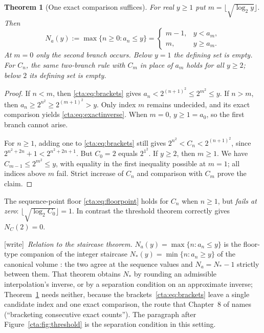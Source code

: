 \documentclass[11pt]{article}
\newtheorem{theorem}{Theorem}[section]
\theoremstyle{definition}
\theoremstyle{remark}
\newcommand{\wtag}{\textup{[write]}}
\begin{document}
\begin{theorem}[One exact comparison suffices]\label{cta:thm:threshold}
For real $y\geq1$ put $m=\lfloor\sqrt{\log_2y}\rfloor$. Then
\begin{equation}\label{cta:eq:exactinverse}
 N_a(y):=\max\{n\geq0:a_n\leq y\}
   =\begin{cases}m-1,&y<a_m,\\m,&y\geq a_m.\end{cases}
\end{equation}
At $m=0$ only the second branch occurs. Below $y=1$ the defining set is empty.
For $C_n$, the same two-branch rule with $C_m$ in place of $a_m$ holds
for all $y\geq2$; below $2$ its defining set is empty.
\end{theorem}
\begin{proof}
If $n<m$, then \eqref{cta:eq:brackets} gives
$a_n<2^{(n+1)^2}\leq2^{m^2}\leq y$. If $n>m$, then
$a_n\geq2^{n^2}\geq2^{(m+1)^2}>y$. Only index $m$ remains undecided,
and its exact comparison yields \eqref{cta:eq:exactinverse}.
When $m=0$, $y\geq1=a_0$, so the first branch cannot arise.

For $n\geq1$, adding one to \eqref{cta:eq:brackets} still gives
$2^{n^2}<C_n<2^{(n+1)^2}$, since
$2^{n^2+2n}+1<2^{n^2+2n+1}$. But $C_0=2$ equals $2^{1^2}$.
If $y\geq2$, then $m\geq1$. We have $C_{m-1}\leq2^{m^2}\leq y$,
with equality in the first inequality possible at $m=1$; all indices
above $m$ fail. Strict increase of $C_n$ and comparison with $C_m$
prove the claim.
\end{proof}

The sequence-point floor \eqref{cta:eq:floorpoint} holds for $C_n$ when
$n\geq1$, but \emph{fails at zero}:
$\lfloor\sqrt{\log_2C_0}\rfloor=1$. In contrast the threshold theorem
correctly gives $N_C(2)=0$.

\wtag\ \emph{Relation to the staircase theorem.} $N_a(y)=\max\{n:a_n\le y\}$
is the floor-type companion of the integer staircase
$N_\ast(y)=\min\{n:a_n\ge y\}$ of the canonical volume \cite[Theorem~J.43,
\texttt{p0:thm:staircase}]{tsvol}: the two agree at the sequence values and
$N_a=N_\ast-1$ strictly between them. That theorem obtains $N_\ast$ by
rounding an admissible interpolation's inverse, or by a separation
condition on an approximate inverse; Theorem~\ref{cta:thm:threshold}
needs neither, because the brackets~\eqref{cta:eq:brackets} leave a single
candidate index and one exact comparison, the route that Chapter~8 of
\cite{cti} names (``bracketing consecutive exact counts''). The paragraph
after Figure~\ref{cta:fig:threshold} is the separation condition in this
setting.
\end{document}
